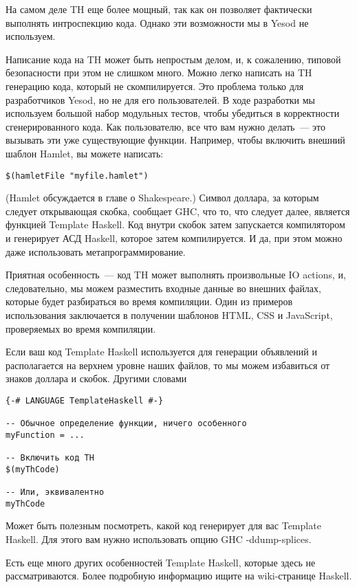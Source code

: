 На самом деле TH еще более мощный, так как он позволяет фактически выполнять интроспекцию кода. Однако эти возможности мы в Yesod не используем.

Написание кода на TH может быть непростым делом, и, к сожалению, типовой безопасности при этом не слишком много. Можно легко написать на TH генерацию кода, который не скомпилируется. Это проблема только для разработчиков Yesod, но не для его пользователей. В ходе разработки мы используем большой набор модульных тестов, чтобы убедиться в корректности сгенерированного кода. Как пользователю, все что вам нужно делать~--- это вызывать эти уже существующие функции. Например, чтобы включить внешний шаблон Hamlet, вы можете написать:

\begin{verbatim}
$(hamletFile "myfile.hamlet")
\end{verbatim}

(Hamlet обсуждается в главе о Shakespeare.) Символ доллара, за которым следует открывающая скобка, сообщает GHC, что то, что следует далее, является функцией Template Haskell. Код внутри скобок затем запускается компилятором и генерирует АСД Haskell, которое затем компилируется. И да, при этом можно даже использовать метапрограммирование.

Приятная особенность~--- код TH может выполнять произвольные IO actions, и, следовательно, мы можем разместить входные данные во внешних файлах, которые будет разбираться во время компиляции. Один из примеров использования заключается в получении шаблонов HTML, CSS и JavaScript, проверяемых во время компиляции.

Если ваш код Template Haskell используется для генерации объявлений и располагается на верхнем уровне наших файлов, то мы можем избавиться от знаков доллара и скобок. Другими словами

\begin{verbatim}
{-# LANGUAGE TemplateHaskell #-}

-- Обычное определение функции, ничего особенного
myFunction = ...

-- Включить код TH
$(myThCode)

-- Или, эквивалентно
myThCode
\end{verbatim}

Может быть полезным посмотреть, какой код генерирует для вас Template Haskell. Для этого вам нужно использовать опцию GHC -ddump-splices.

Есть еще много других особенностей Template Haskell, которые здесь не рассматриваются. Более подробную информацию ищите на wiki-странице Haskell.

